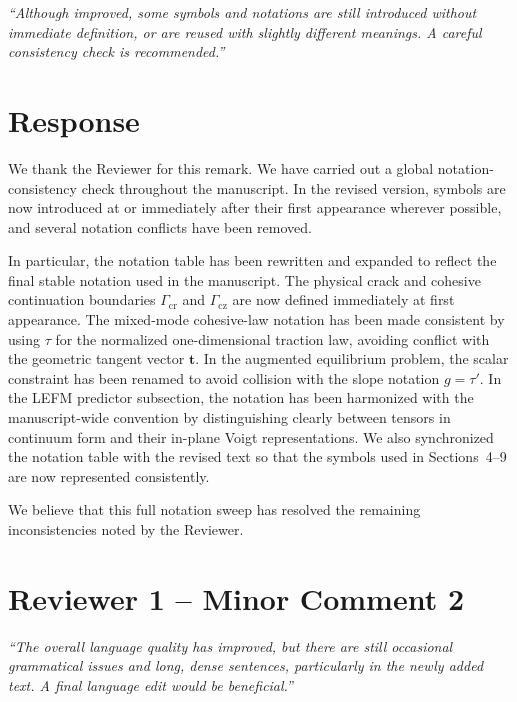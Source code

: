 \documentclass[12pt,a4paper]{article}
\begin{document}
	\begin{tcolorbox}[reviewerbox]
		\emph{``Although improved, some symbols and notations are still introduced without immediate definition, or are reused with slightly different meanings. A careful consistency check is recommended.''}
	\end{tcolorbox}
	
	\section*{Response}
	
	\begin{tcolorbox}[authorbox]
		We thank the Reviewer for this remark. We have carried out a global notation-consistency check throughout the manuscript. In the revised version, symbols are now introduced at or immediately after their first appearance wherever possible, and several notation conflicts have been removed.
		
		In particular, the notation table has been rewritten and expanded to reflect the final stable notation used in the manuscript. The physical crack and cohesive continuation boundaries \(\Gamma_{\mathrm{cr}}\) and \(\Gamma_{\mathrm{cz}}\) are now defined immediately at first appearance. The mixed-mode cohesive-law notation has been made consistent by using \(\tau\) for the normalized one-dimensional traction law, avoiding conflict with the geometric tangent vector \(\mathbf t\). In the augmented equilibrium problem, the scalar constraint has been renamed to avoid collision with the slope notation \(g=\tau'\). In the LEFM predictor subsection, the notation has been harmonized with the manuscript-wide convention by distinguishing clearly between tensors in continuum form and their in-plane Voigt representations. We also synchronized the notation table with the revised text so that the symbols used in Sections~4--9 are now represented consistently.
		
		We believe that this full notation sweep has resolved the remaining inconsistencies noted by the Reviewer.
	\end{tcolorbox}
	
	\section*{Reviewer 1 -- Minor Comment 2}
	
	\begin{tcolorbox}[reviewerbox]
		\emph{``The overall language quality has improved, but there are still occasional grammatical issues and long, dense sentences, particularly in the newly added text. A final language edit would be beneficial.''}
	\end{tcolorbox}
	
\end{document}
